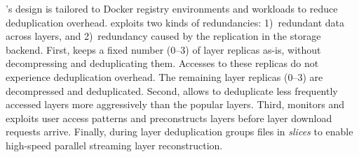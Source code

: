 %
\sysname's design is tailored to Docker registry environments and workloads to
reduce deduplication overhead.
%
\sysname exploits two kinds of redundancies: 1)~redundant data across layers,
and 2)~redundancy caused by the replication in the storage backend.
%
First, \sysname keeps a fixed number (0--3) of layer replicas as-is, without
decompressing and deduplicating them.
%
Accesses to these replicas do not experience deduplication overhead.
%
The remaining layer replicas (0--3) are decompressed and deduplicated.
%
Second, \sysname allows to deduplicate less frequently accessed layers more
aggressively than the popular layers.
%
Third, \sysname monitors and exploits user access patterns and preconstructs
layers before layer download requests arrive.
%
Finally, during layer deduplication \sysname groups files in \emph{slices} to
enable high-speed parallel streaming layer reconstruction.
%



%
